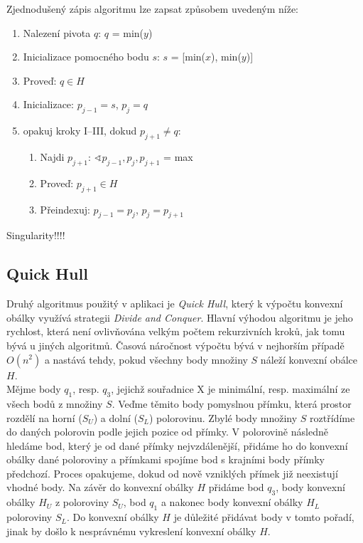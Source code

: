 \documentclass[a4paper, 12pt]{article}
\begin{document}
Zjednodušený zápis algoritmu lze zapsat způsobem uvedeným níže:

\begin{enumerate}
\item Nalezení pivota $q$: $q$ = min($y$) 
\item Inicializace pomocného bodu $s$: $s$ = [min($x$), min($y$)]
\item Proveď: $q \in H$
\item Inicializace: $p_{j-1} = s$, $p_j = q$
\item opakuj kroky I–III, dokud $p_{j+1} \neq q$:
\begin{enumerate}[label=\Roman*.]
\item 	Najdi $p_{j+1}$: $\sphericalangle p_{j-1}, p_j, p_{j+1}$ = max
\item 	Proveď: $p_{j+1} \in H$
\item 	Přeindexuj: $p_{j-1} = p_j$, $p_j = p_{j+1}$
\end{enumerate}
\end{enumerate}


Singularity!!!!

\subsection{Quick Hull}
Druhý algoritmus použitý v aplikaci je \textit{Quick Hull}, který k výpočtu konvexní obálky využívá strategii \textit{Divide and Conquer}. Hlavní výhodou algoritmu je jeho rychlost, která není ovlivňována velkým počtem rekurzivních kroků, jak tomu bývá u jiných algoritmů. Časová náročnost výpočtu bývá v nejhorším případě $O(n^2)$ a nastává tehdy, pokud všechny body množiny $S$ náleží konvexní obálce $H$.\\

Mějme body $q_1$, resp. $q_3$, jejichž souřadnice X je minimální, resp. maximální ze všech bodů z množiny $S$. Veďme těmito body pomyslnou přímku, která prostor rozdělí na horní ($S_U$) a dolní ($S_L$) polorovinu. Zbylé body množiny $S$ roztřídíme do daných polorovin podle jejich pozice od přímky. V polorovině následně hledáme bod, který je od dané přímky nejvzdálenější, přidáme ho do konvexní obálky dané poloroviny a přímkami spojíme bod s krajními body přímky předchozí. Proces opakujeme, dokud od nově vzniklých přímek již neexistují vhodné body. Na závěr do konvexní obálky $H$ přidáme bod $q_3$, body konvexní obálky $H_U$ z poloroviny $S_U$, bod $q_1$ a nakonec body konvexní obálky $H_L$ poloroviny $S_L$. Do konvexní obálky $H$ je důležité přidávat body v tomto pořadí, jinak by došlo k nesprávnému vykreslení konvexní obálky $H$. \\
\end{document}
